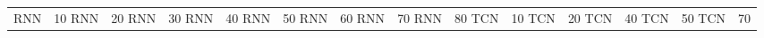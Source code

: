\begin{table}
\begin{tabular}{|l|c|c|c|c|c|c|c|c|}
RNN & 10%
RNN & 20%
RNN & 30%
RNN & 40%
RNN & 50%
RNN & 60%
RNN & 70%
RNN & 80%
TCN & 10%
TCN & 20%
TCN & 40%
TCN & 50%
TCN & 70%

\end{tabular}
\end{table}

